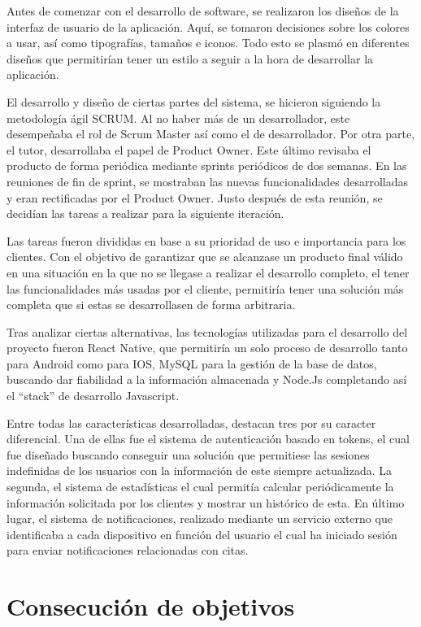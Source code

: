 Antes de comenzar con el desarrollo de software, se realizaron los diseños de la interfaz de usuario de la aplicación. Aquí, se tomaron decisiones sobre los colores a usar, así como tipografías, tamaños e iconos. Todo esto se plasmó en diferentes diseños que permitirían tener un estilo a seguir a la hora de desarrollar la aplicación. 

El desarrollo y diseño de ciertas partes del sistema, se hicieron siguiendo la metodología ágil SCRUM. Al no haber más de un desarrollador, este desempeñaba el rol de Scrum Master así como el de desarrollador. Por otra parte, el tutor, desarrollaba el papel de Product Owner. Este último revisaba el producto de forma periódica mediante sprints periódicos de dos semanas. En las reuniones de fin de sprint, se mostraban las nuevas funcionalidades desarrolladas y eran rectificadas por el Product Owner. Justo después de esta reunión, se decidían las tareas a realizar para la siguiente iteración. 

Las tareas fueron divididas en base a su prioridad de uso e importancia para los clientes. Con el objetivo de garantizar que se alcanzase un producto final válido en una situación en la que no se llegase a realizar el desarrollo completo, el tener las funcionalidades más usadas por el cliente, permitiría tener una solución más completa que si estas se desarrollasen de forma arbitraria.

Tras analizar ciertas alternativas, las tecnologías utilizadas para el desarrollo del proyecto fueron React Native, que permitiría un solo proceso de desarrollo tanto para Android como para IOS, MySQL para la gestión de la base de datos, buscando dar fiabilidad a la información almacenada y Node.Js completando así el ``stack'' de desarrollo Javascript.

Entre todas las características desarrolladas, destacan tres por su caracter diferencial. Una de ellas fue el sistema de autenticación basado en tokens, el cual fue diseñado buscando conseguir una solución que permitiese las sesiones indefinidas de los usuarios con la información de este siempre actualizada. La segunda, el sistema de estadísticas el cual permitía calcular periódicamente la información solicitada por los clientes y mostrar un histórico de esta. En último lugar, el sistema de notificaciones, realizado mediante un servicio externo que identificaba a cada dispositivo en función del usuario el cual ha iniciado sesión para enviar notificaciones relacionadas con citas.

\section{Consecución de objetivos}

